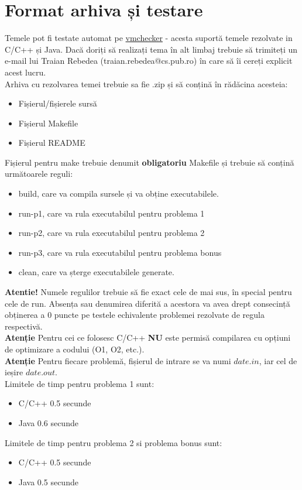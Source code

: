 \documentclass[a4paper,5pt]{article}
\begin{document}
\section{Format arhiva și testare}

Temele pot fi testate automat pe \href{elf.cs.pub.ro/vmchecker}{vmchecker} -
acesta suportă temele rezolvate in C/C++ și Java. Dacă doriți să realizați tema
în alt limbaj trebuie să trimiteți un e-mail lui Traian Rebedea
(traian.rebedea@cs.pub.ro) în care să îi cereți explicit acest lucru.\\
Arhiva cu rezolvarea temei trebuie sa fie .zip și să conțină în rădăcina acesteia:
\begin{itemize}
  \item Fișierul/fișierele sursă
  \item Fișierul Makefile
  \item Fișierul README
\end{itemize}
Fișierul pentru make trebuie denumit \textbf{obligatoriu} Makefile și trebuie
să conțină următoarele reguli:
\begin{itemize}
  \item build, care va compila sursele și va obține executabilele.
  \item run-p1, care va rula executabilul pentru problema 1
  \item run-p2, care va rula executabilul pentru problema 2
  \item run-p3, care va rula executabilul pentru problema bonus
  \item clean, care va șterge executabilele generate.
\end{itemize}
\textbf{Atentie!} Numele regulilor trebuie să fie exact cele de mai sus, în
special pentru cele de run. Absența sau denumirea diferită a
acestora va avea drept consecință obținerea a $0$ puncte pe testele echivalente
problemei rezolvate de regula respectivă.\\
\textbf{Atenție} Pentru cei ce folosesc C/C++ \textbf{NU} este permisă compilarea cu
opțiuni de optimizare a codului (O1, O2, etc.).\\
\textbf{Atenție} Pentru fiecare problemă, fișierul de intrare se va numi
$date.in$, iar cel de ieșire $date.out$.\\
Limitele de timp pentru problema 1 sunt:
\begin{itemize}
  \item C/C++ 0.5 secunde
  \item Java 0.6 secunde
\end{itemize}
Limitele de timp pentru problema 2 si problema bonus sunt:
\begin{itemize}
  \item C/C++ 0.5 secunde
  \item Java 0.5 secunde
\end{itemize}
\end{document}
